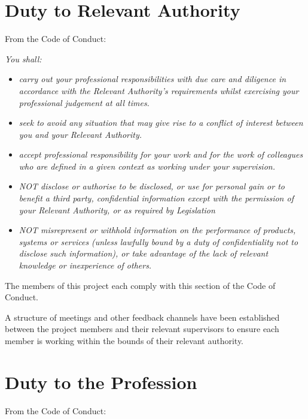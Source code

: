 \documentclass[a4paper]{report}
\begin{document}
\section{Duty to Relevant Authority}

From the Code of Conduct: \cite{CoC}

\textit{You shall:}
\begin{itemize}
\item \textit{carry out your professional responsibilities with due care and diligence in accordance with the Relevant Authority’s requirements whilst exercising your professional judgement at all times.}
\item \textit{seek to avoid any situation that may give rise to a conflict of interest between you and your Relevant Authority.}
\item \textit{accept professional responsibility for your work and for the work of colleagues who are defined in a given context as working under your supervision.}
\item \textit{NOT disclose or authorise to be disclosed, or use for personal gain or to benefit a third party, confidential information except with the permission of your Relevant Authority, or as required by Legislation}
\item \textit{NOT misrepresent or withhold information on the performance of products, systems or services (unless lawfully bound by a duty of confidentiality not to disclose such information), or take advantage of the lack of relevant knowledge or inexperience of others. }
\end{itemize}

The members of this project each comply with this section of the Code of Conduct.

A structure of meetings and other feedback channels have been established between the project members and their relevant supervisors to ensure each member is working within the bounds of their relevant authority.

\section{Duty to the Profession}

From the Code of Conduct: \cite{CoC}
\end{document}
